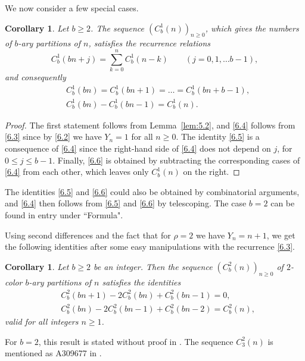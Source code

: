 \documentclass{amsart}
\theoremstyle{plain}
\newtheorem{corollary}[theorem]{Corollary}
\numberwithin{equation}{section}
\begin{document}
We now consider a few special cases.

\begin{corollary}\label{cor:6.3}
Let $b\geq 2$. The sequence $\left(C_b^1(n)\right)_{n\geq 0}$, which gives the
numbers of $b$-ary partitions of $n$, satisfies the recurrence relations
\begin{equation}\label{6.4}
C_b^1(bn+j)=\sum_{k=0}^n C_b^1(n-k) \qquad (j=0, 1,\ldots b-1),
\end{equation}
and consequently
\begin{align}
&C_b^1(bn) = C_b^1(bn+1) = \dots = C_b^1(bn+b-1),\label{6.5}\\
&C_b^1(bn) - C_b^1(bn-1) = C_b^1(n).\label{6.6}
\end{align}
\end{corollary}

\begin{proof}
The first statement follows from Lemma~\ref{lem:5.2}, and \eqref{6.4} follows
from \eqref{6.3} since by \eqref{6.2} we have $Y_n=1$ for all $n\geq 0$.
The identity \eqref{6.5} is a consequence of \eqref{6.4} since the right-hand
side of \eqref{6.4} does not depend on $j$, for $0\leq j\leq b-1$. Finally,
\eqref{6.6} is obtained by subtracting the corresponding cases of \eqref{6.4}
from each other, which leaves only $C_b^1(n)$ on the right.
\end{proof}

The identities \eqref{6.5} and \eqref{6.6} could also be obtained by 
combinatorial arguments, and \eqref{6.4} then follows from \eqref{6.5} and
\eqref{6.6} by telescoping. The case $b=2$ can be found in entry 
\cite[A018819]{OEIS} under ``Formula". 

Using second differences and the fact that for $\rho=2$ we have $Y_n=n+1$, we
get the following identities after some easy manipulations with the recurrence
\eqref{6.3}.

\begin{corollary}\label{cor:6.4}
Let $b\geq 2$ be an integer. Then the sequence 
$\left(C_b^2(n)\right)_{n\geq 0}$ of $2$-color $b$-ary partitions of $n$ 
satisfies the identities
\begin{align}
&C_b^2(bn+1)-2C_b^2(bn)+C_b^2(bn-1)=0,\label{6.7}\\
&C_b^2(bn)-2C_b^2(bn-1)+C_b^2(bn-2)=C_b^2(n),\label{6.8}
\end{align}
valid for all integers $n\geq 1$.
\end{corollary}

For $b=2$, this result is stated without proof in \cite[A171238]{OEIS}.
The sequence $C_3^2(n)$ is mentioned as A309677 in \cite{OEIS}.
\end{document}
